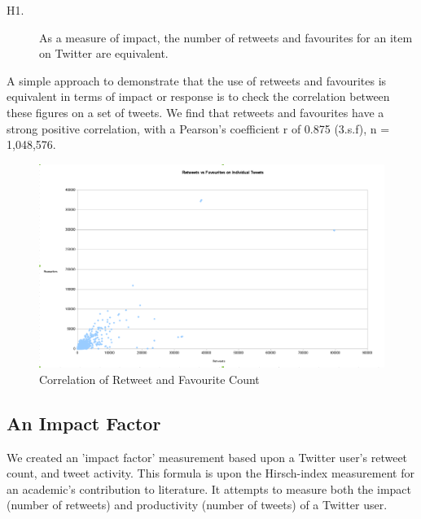 \begin{description}
 \item [H1.]{As a measure of impact, the number of retweets and favourites for an item on Twitter are equivalent.}
\end{description}

A simple approach to demonstrate that the use of retweets and favourites is equivalent in terms of impact or response is to check the correlation between these figures on a set of tweets. We find that retweets and favourites have a strong positive correlation, with a Pearson's coefficient r of 0.875 (3.s.f), n = 1,048,576. 

\begin{figure}[h!]
\begin{center}
 \centering
\includegraphics[width=500px]{Images/retweets_vs_favourites.pdf}
\caption{Correlation of Retweet and Favourite Count}
\end{center}
\end{figure}


\subsection{An Impact Factor}

We created an 'impact factor' measurement based upon a Twitter user's retweet count, and tweet activity. This formula is upon the Hirsch-index \cite{hirsch2005index} measurement for an academic's contribution to literature. It attempts to measure both the impact (number of retweets) and productivity (number of tweets) of a Twitter user. 

